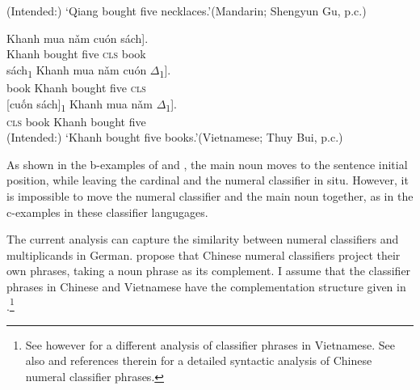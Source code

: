 \documentclass[output=paper]{langscibook}
\begin{document}

\z
\glt (Intended:) `Qiang bought five necklaces.'\hfill(Mandarin; Shengyun Gu, p.c.)
\z

\ea\label{tat:viet.top}
\ea
\gll Khanh mua \minsp{[} {n\v{a}m} {cuón} sách\textnormal{]}.\\  
     Khanh bought {} five \textsc{cls} book\\ 

\ex
\gll sách\textnormal{\textsubscript{1}} Khanh mua \minsp{[} {n\v{a}m} {cuón} $\Delta$\textnormal{\textsubscript{1}}\textnormal{]}.\\  
     book Khanh bought {} five \textsc{cls}\\ 

\ex
\gll \llap{*}\textnormal{[}{cu\'{\^{o}}n} sách\textnormal{]\textsubscript{1}} Khanh mua \minsp{[}    {n\v{a}m} $\Delta$\textnormal{\textsubscript{1}}\textnormal{]}.\\  
     \hspace*{1.5mm}\textsc{cls} book Khanh bought {} five\\
\z
\glt (Intended:) `Khanh bought five books.'\hfill(Vietnamese; Thuy Bui, p.c.)
\z

\noindent As shown in the b-examples of  and , the main noun moves to the sentence initial position, while leaving the cardinal and the numeral classifier in situ. However, it is impossible to move the numeral classifier and the main noun together, as in the c-examples in these classifier langugages. 

The current analysis can capture the similarity between numeral classifiers and multiplicands in German. \citet{HuangOchi2014} propose that Chinese numeral classifiers project their own phrases, taking a noun phrase as its complement. I assume that the classifier phrases in Chinese and Vietnamese have the complementation structure given in .\footnote{See however \citet{Nguyen2004} for a different analysis of classifier phrases in Vietnamese. See also \citet{Zhang2013} and references therein for a detailed syntactic analysis of Chinese numeral classifier phrases.}
\end{document}
